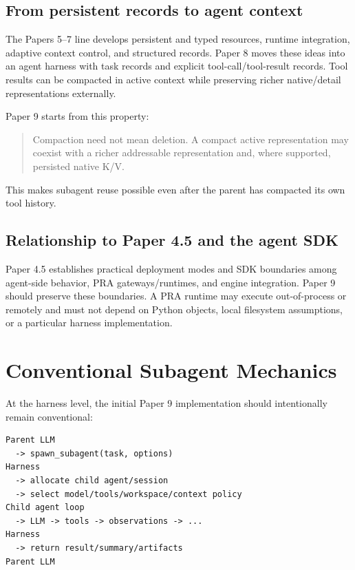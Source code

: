 \documentclass[11pt]{article}
\begin{document}
\subsection{From persistent records to agent context}

The Papers 5--7 line develops persistent and typed resources, runtime integration, adaptive context control, and structured records. Paper 8 moves these ideas into an agent harness with task records and explicit tool-call/tool-result records. Tool results can be compacted in active context while preserving richer native/detail representations externally.

Paper 9 starts from this property:

\begin{quote}
Compaction need not mean deletion. A compact active representation may coexist with a richer addressable representation and, where supported, persisted native K/V.
\end{quote}

This makes subagent reuse possible even after the parent has compacted its own tool history.

\subsection{Relationship to Paper 4.5 and the agent SDK}

Paper 4.5 establishes practical deployment modes and SDK boundaries among agent-side behavior, PRA gateways/runtimes, and engine integration. Paper 9 should preserve these boundaries. A PRA runtime may execute out-of-process or remotely and must not depend on Python objects, local filesystem assumptions, or a particular harness implementation.

\section{Conventional Subagent Mechanics}

At the harness level, the initial Paper 9 implementation should intentionally remain conventional:

\begin{lstlisting}[basicstyle=\ttfamily\small]
Parent LLM
  -> spawn_subagent(task, options)
Harness
  -> allocate child agent/session
  -> select model/tools/workspace/context policy
Child agent loop
  -> LLM -> tools -> observations -> ...
Harness
  -> return result/summary/artifacts
Parent LLM
\end{lstlisting}
\end{document}
